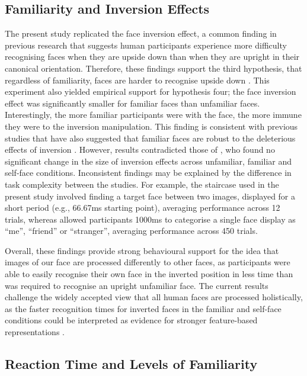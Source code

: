 \documentclass[
  10pt,
  letterpaper,
]{article}
\begin{document}
\subsection{Familiarity and Inversion
Effects}\label{familiarity-and-inversion-effects}

The present study replicated the face inversion effect, a common finding
in previous research that suggests human participants experience more
difficulty recognising faces when they are upside down than when they
are upright in their canonical orientation. Therefore, these findings
support the third hypothesis, that regardless of familiarity, faces are
harder to recognise upside down
\citep{allen-davidian2021a, kramer2018a, taubert2011a, young2017a}. This
experiment also yielded empirical support for hypothesis four; the face
inversion effect was significantly smaller for familiar faces than
unfamiliar faces. Interestingly, the more familiar participants were
with the face, the more immune they were to the inversion manipulation.
This finding is consistent with previous studies that have also
suggested that familiar faces are robust to the deleterious effects of
inversion \citep{keyes2012a, keyes2010a, yang2014a}. However, results
contradicted those of \citet{alzueta2019a}, who found no significant
change in the size of inversion effects across unfamiliar, familiar and
self-face conditions. Inconsistent findings may be explained by the
difference in task complexity between the studies. For example, the
staircase used in the present study involved finding a target face
between two images, displayed for a short period (e.g., 66.67ms starting
point), averaging performance across 12 trials, whereas
\citet{alzueta2019a} allowed participants 1000ms to categorise a single
face display as ``me'', ``friend'' or ``stranger'', averaging
performance across 450 trials.

Overall, these findings provide strong behavioural support for the idea
that images of our face are processed differently to other faces, as
participants were able to easily recognise their own face in the
inverted position in less time than was required to recognise an upright
unfamiliar face. The current results challenge the widely accepted view
that all human faces are processed holistically, as the faster
recognition times for inverted faces in the familiar and self-face
conditions could be interpreted as evidence for stronger feature-based
representations \citep{gerlach2022a, tong1999a}.

\subsection{Reaction Time and Levels of
Familiarity}\label{reaction-time-and-levels-of-familiarity}
\end{document}

